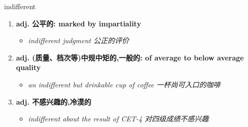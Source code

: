 
\begin{frame}
{\huge indifferent}
\begin{center}
\begin{enumerate}\Large
  \item \textbf{adj. 公平的: marked by impartiality}
  \begin{itemize}
    \item \em{\Large{indifferent judgment 公正的评价}}
  \end{itemize}
  \item \textbf{adj. (质量、档次等)中规中矩的,一般的: of average to below average quality}
  \begin{itemize}
    \item \em{\Large{an indifferent but drinkable cup of coffee 一杯尚可入口的咖啡}}
  \end{itemize}
  \item \textbf{adj. 不感兴趣的,冷漠的}
  \begin{itemize}
    \item \em{\Large{indifferent about the result of CET-4 对四级成绩不感兴趣}}
  \end{itemize}
\end{enumerate}
\end{center}
\end{frame}
